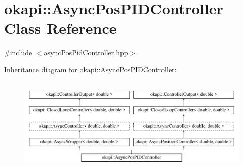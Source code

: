 \hypertarget{classokapi_1_1AsyncPosPIDController}{}\section{okapi\+::Async\+Pos\+P\+I\+D\+Controller Class Reference}
\label{classokapi_1_1AsyncPosPIDController}


{\ttfamily \#include $<$async\+Pos\+Pid\+Controller.\+hpp$>$}

Inheritance diagram for okapi\+::Async\+Pos\+P\+I\+D\+Controller\+:\begin{figure}[H]
\begin{center}
\leavevmode
\includegraphics[height=4.651163cm]{classokapi_1_1AsyncPosPIDController}
\end{center}
\end{figure}
